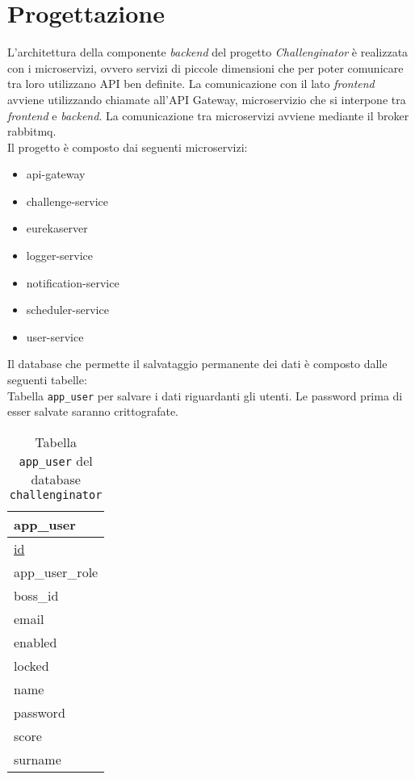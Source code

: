 \section{Progettazione}

L'architettura della componente \textit{backend} del progetto \textit{Challenginator} è realizzata con i microservizi, ovvero servizi di piccole dimensioni che per poter comunicare tra loro utilizzano API ben definite.
La comunicazione con il lato \textit{frontend} avviene utilizzando chiamate all'API Gateway, microservizio che si interpone tra \textit{frontend} e \textit{backend}.
La comunicazione tra microservizi avviene mediante il broker \gls{rabbitmq}.\\
Il progetto è composto dai seguenti microservizi:
\begin{itemize}
    \item api-gateway
    \item challenge-service
    \item eurekaserver
    \item logger-service
    \item notification-service
    \item scheduler-service
    \item user-service
\end{itemize}
Il database che permette il salvataggio permanente dei dati è composto dalle seguenti tabelle:\\
Tabella \texttt{app\_user} per salvare i dati riguardanti gli utenti. Le password prima di esser salvate saranno crittografate.
\begin{table}[H]
    \centering
    \begin{tabular}{|p{4cm}|}
    \hline
    \textbf{app\_user}\\\hline
    \underline{id}\\
    app\_user\_role\\
    boss\_id\\
    email\\
    enabled\\
    locked\\
    name\\
    password\\
    score\\
    surname\\\hline
    \end{tabular}
    \caption{Tabella \texttt{app\_user} del database \texttt{challenginator}}
\end{table}

